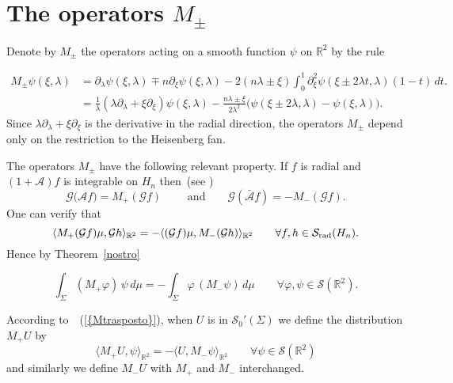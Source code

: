 \documentclass[12pt,a4paper]{amsart}
\theoremstyle{plain}
\theoremstyle{definition}
\numberwithin{equation}{section}
\begin{document}
 
\section{The operators ${M}_\pm$}

Denote by   ${M}_\pm$   the  operators acting on a
smooth function   $\psi$  on ${\mathbb R}^2$ by the rule~\cite{BJR}
 
$$
\begin{aligned}
  M_\pm \psi(\xi,{\lambda})&= \partial_{\lambda} \psi(\xi,{\lambda})\mp{n}
   \partial_\xi \psi(\xi,{\lambda})-2({n}{\lambda}\pm\xi)
\int_0^1\partial^2_\xi \psi(\xi\pm2{\lambda} t,{\lambda} )(1-t)\,dt. 
 \\
 &=\frac{1}{\lambda}\left({\lambda} \partial_{\lambda}+\xi\partial_\xi\right)\psi(\xi,{\lambda})-
 \frac{{n}{\lambda}\pm\xi}{2{\lambda}^2}\big(\psi(\xi\pm 2{\lambda},{\lambda})-\psi(\xi,{\lambda}) \big).
 \end{aligned}
$$
Since ${\lambda} \partial_{\lambda}+\xi\partial_\xi$ is  the derivative in the radial 
direction,
the operators ${M}_\pm$ depend only on the restriction to  the Heisenberg fan.   

The operators $M_\pm$ have the following relevant property. If $f$  is radial  and $(1+\mathcal A )f$ is
integrable   on ${{H_{n}}}$   then~(see \cite{BJR})
 \begin{equation}\label{Mpm}
 {\mathcal G}({{{\mathcal A}f)}}=M_+ ( {\mathcal G}{ f })
 \qquad{\text{ and}}\qquad  {\mathcal G}({{\bar{\mathcal A}f}})=-M_- ( {\mathcal G}{ f})
 .
\end{equation}
 One can verify that 
$$
{\langle {M_+({\mathcal G} f)\mu},{{\mathcal G} h} \rangle_{{\mathbb R}^2}}=-{\langle {({\mathcal G} f)\mu},{M_-({\mathcal G} h)} \rangle_{{\mathbb R}^2}}
\qquad \forall f, h\in {{\mathcal S}_{\text{\rm rad}}({{H_{n}}})}.
$$
Hence by Theorem~\ref{nostro}
 
 \begin{equation}\label{Mtrasposto}
\int_{\Sigma} (M_+{\varphi})\,\psi\, d\mu=
-\int_{\Sigma} {\varphi}\, (M_-\psi)\, d\mu
\qquad \forall {\varphi},\psi\in {\mathcal S}({\mathbb R}^2).
\end{equation}
 
According to~{~(\ref{{Mtrasposto}})},
when $U$ is in ${\mathcal S}_0'({\Sigma})$ we define the distribution $M_+U$ by
$$
{\langle {M_+U},{\psi} \rangle_{{\mathbb R}^2}}
=-{\langle {U},{M_-\psi} \rangle_{{\mathbb R}^2}}
\qquad\forall \psi\in {\mathcal S}({\mathbb R}^2)
$$
and similarly 
we define $M_-U$
with $M_+$ and $M_-$ interchanged.
\end{document}
